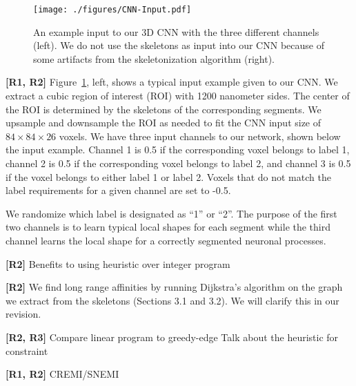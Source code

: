 \documentclass[runningheads]{llncs}
\begin{document}
\begin{figure}
\centering
\texttt{[image: ./figures/CNN-Input.pdf]}
\caption{An example input to our 3D CNN with the three different channels (left). We do not use the skeletons as input into our CNN because of some artifacts from the skeletonization algorithm (right).}
\label{fig:cnn-input}
\end{figure}

\noindent
\textbf{[R1, R2]} Figure~\ref{fig:cnn-input}, left, shows a typical input example given to our CNN. 
We extract a cubic region of interest (ROI) with 1200 nanometer sides.
The center of the ROI is determined by the skeletons of the corresponding segments.
We upsample and downsample the ROI as needed to fit the CNN input size of $84\times84\times26$ voxels.
We have three input channels to our network, shown below the input example.  
Channel 1 is 0.5 if the corresponding voxel belongs to label 1, channel 2 is 0.5 if the corresponding voxel belongs to label 2, and channel 3 is 0.5 if the voxel belongs to either label 1 or label 2.
Voxels that do not match the label requirements for a given channel are set to -0.5.

We randomize which label is designated as ``1'' or ``2''. 
The purpose of the first two channels is to learn typical local shapes for each segment while the third channel learns the local shape for a correctly segmented neuronal processes.

\noindent
\textbf{[R2]}
Benefits to using heuristic over integer program

\noindent
\textbf{[R2]}
We find long range affinities by running Dijkstra's algorithm on the graph we extract from the skeletons (Sections 3.1 and 3.2). 
We will clarify this in our revision.

\noindent
\textbf{[R2, R3]}
Compare linear program to greedy-edge
Talk about the heuristic for constraint

\noindent
\textbf{[R1, R2]}
CREMI/SNEMI





\end{document}
